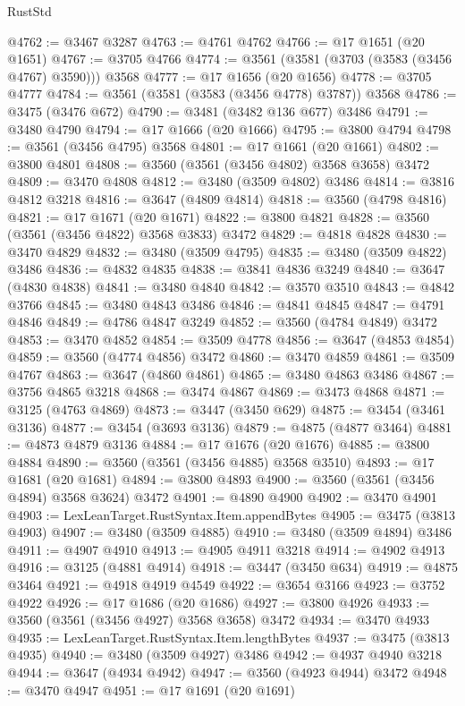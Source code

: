 \begin{lexlean}{RustStd}
\begin{coremodule}
{\begin{coremodule}
{{{{{{{{{{{{{{{{{{{{{{{{{{{{{{{{{{{{{{{{{{{{{@4762 := @3467 @3287
@4763 := @4761 @4762
@4766 := @17 @1651 (@20 @1651)
@4767 := @3705 @4766
@4774 := @3561 (@3581 (@3703 (@3583 (@3456 @4767) @3590))) @3568
@4777 := @17 @1656 (@20 @1656)
@4778 := @3705 @4777
@4784 := @3561 (@3581 (@3583 (@3456 @4778) @3787)) @3568
@4786 := @3475 (@3476 @672)
@4790 := @3481 (@3482 @136 @677) @3486
@4791 := @3480 @4790
@4794 := @17 @1666 (@20 @1666)
@4795 := @3800 @4794
@4798 := @3561 (@3456 @4795) @3568
@4801 := @17 @1661 (@20 @1661)
@4802 := @3800 @4801
@4808 := @3560 (@3561 (@3456 @4802) @3568 @3658) @3472
@4809 := @3470 @4808
@4812 := @3480 (@3509 @4802) @3486
@4814 := @3816 @4812 @3218
@4816 := @3647 (@4809 @4814)
@4818 := @3560 (@4798 @4816)
@4821 := @17 @1671 (@20 @1671)
@4822 := @3800 @4821
@4828 := @3560 (@3561 (@3456 @4822) @3568 @3833) @3472
@4829 := @4818 @4828
@4830 := @3470 @4829
@4832 := @3480 (@3509 @4795)
@4835 := @3480 (@3509 @4822) @3486
@4836 := @4832 @4835
@4838 := @3841 @4836 @3249
@4840 := @3647 (@4830 @4838)
@4841 := @3480 @4840
@4842 := @3570 @3510
@4843 := @4842 @3766
@4845 := @3480 @4843 @3486
@4846 := @4841 @4845
@4847 := @4791 @4846
@4849 := @4786 @4847 @3249
@4852 := @3560 (@4784 @4849) @3472
@4853 := @3470 @4852
@4854 := @3509 @4778
@4856 := @3647 (@4853 @4854)
@4859 := @3560 (@4774 @4856) @3472
@4860 := @3470 @4859
@4861 := @3509 @4767
@4863 := @3647 (@4860 @4861)
@4865 := @3480 @4863 @3486
@4867 := @3756 @4865 @3218
@4868 := @3474 @4867
@4869 := @3473 @4868
@4871 := @3125 (@4763 @4869)
@4873 := @3447 (@3450 @629)
@4875 := @3454 (@3461 @3136)
@4877 := @3454 (@3693 @3136)
@4879 := @4875 (@4877 @3464)
@4881 := @4873 @4879 @3136
@4884 := @17 @1676 (@20 @1676)
@4885 := @3800 @4884
@4890 := @3560 (@3561 (@3456 @4885) @3568 @3510)
@4893 := @17 @1681 (@20 @1681)
@4894 := @3800 @4893
@4900 := @3560 (@3561 (@3456 @4894) @3568 @3624) @3472
@4901 := @4890 @4900
@4902 := @3470 @4901
@4903 := LexLeanTarget.RustSyntax.Item.appendBytes
@4905 := @3475 (@3813 @4903)
@4907 := @3480 (@3509 @4885)
@4910 := @3480 (@3509 @4894) @3486
@4911 := @4907 @4910
@4913 := @4905 @4911 @3218
@4914 := @4902 @4913
@4916 := @3125 (@4881 @4914)
@4918 := @3447 (@3450 @634)
@4919 := @4875 @3464
@4921 := @4918 @4919 @4549
@4922 := @3654 @3166
@4923 := @3752 @4922
@4926 := @17 @1686 (@20 @1686)
@4927 := @3800 @4926
@4933 := @3560 (@3561 (@3456 @4927) @3568 @3658) @3472
@4934 := @3470 @4933
@4935 := LexLeanTarget.RustSyntax.Item.lengthBytes
@4937 := @3475 (@3813 @4935)
@4940 := @3480 (@3509 @4927) @3486
@4942 := @4937 @4940 @3218
@4944 := @3647 (@4934 @4942)
@4947 := @3560 (@4923 @4944) @3472
@4948 := @3470 @4947
@4951 := @17 @1691 (@20 @1691)
}}}}}}}}}}}}}}}}}}}}}}}}}}}}}}}}}}}}}}}}}}}}}
\end{coremodule}}
\end{coremodule}
\end{lexlean}
